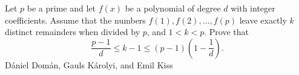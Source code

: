 Let $p$ be a prime and let $f(x)$ be a polynomial of degree $d$ with integer coefficients. Assume that the numbers $f(1),f(2),\dots,f(p)$ leave exactly $k$ distinct remainders when divided by $p$,  and $1<k<p$. Prove that\[ \frac{p-1}{d}\leq k-1\leq (p-1)\left(1-\frac1d \right) .\] Dániel Domán, Gauls Károlyi, and Emil Kiss 